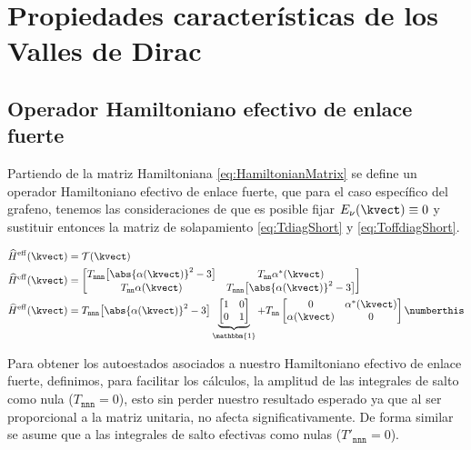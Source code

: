 \section{Propiedades características de los Valles de Dirac}
\subsection{Operador Hamiltoniano efectivo de enlace fuerte}

Partiendo de la matriz Hamiltoniana \eqref{eq:HamiltonianMatrix} se define un operador Hamiltoniano efectivo de enlace fuerte, que para el caso específico del grafeno, tenemos las consideraciones de que es posible fijar $ E_\nu(\kvect) \equiv 0 $ y sustituir entonces la matriz de solapamiento \eqref{eq:TdiagShort} y \eqref{eq:ToffdiagShort}.

\begin{align*}
	\widehat{H}^\mathrm{eff}(\kvect) &= \mathcal{T}(\kvect) \\ 
	\widehat{H}^\mathrm{eff}(\kvect) &= \begin{bmatrix}
	T_{\mathtt{nnn}}\big[\abs{\alpha(\kvect)}^2 - 3\big] & T_{\mathtt{nn}}\alpha^*(\kvect) \\ T_{\mathtt{nn}}\alpha(\kvect) & T_{\mathtt{nnn}}\big[\abs{\alpha(\kvect)}^2 - 3\big]
	\end{bmatrix} \\ 
	\widehat{H}^\mathrm{eff}(\kvect) &= T_{\mathtt{nnn}}\big[\abs{\alpha(\kvect)}^2 - 3\big] \underbrace{\begin{bmatrix}1&0\\0&1\end{bmatrix}}_{\mathbbm{1}} + T_{\mathtt{nn}}\begin{bmatrix} 0 & \alpha^*(\kvect) \\ \alpha(\kvect) & 0 \end{bmatrix}\numberthis\label{eq:TBEffHamiltonian}
\end{align*}

Para obtener los autoestados asociados a nuestro Hamiltoniano efectivo de enlace fuerte, definimos, para facilitar los cálculos, la amplitud de las integrales de salto como nula ($ T_\mathtt{nnn} = 0 $), esto sin perder nuestro resultado esperado ya que al ser proporcional a la matriz unitaria, no afecta significativamente. De forma similar se asume que a las integrales de salto efectivas como nulas ($ T'_\mathtt{nnn} = 0 $).

